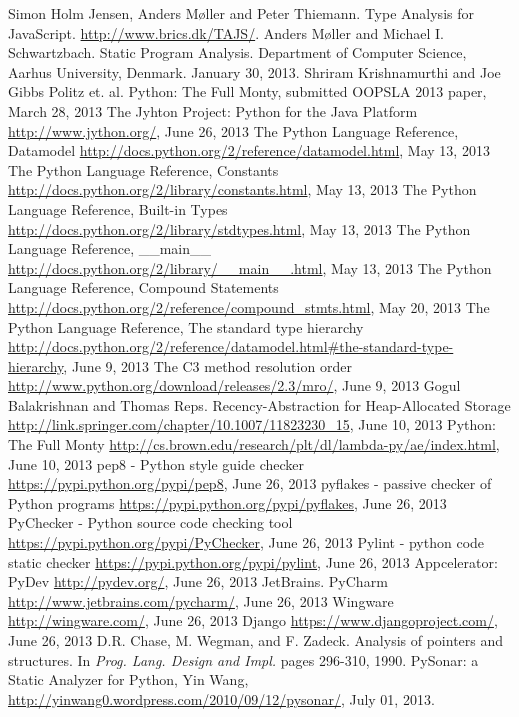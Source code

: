 \begin{thebibliography}{8}

 Simon Holm Jensen, Anders M\o ller and Peter Thiemann. Type Analysis for JavaScript. \url{http://www.brics.dk/TAJS/}.
 Anders M\o ller and Michael I. Schwartzbach. Static Program Analysis. Department of Computer Science, Aarhus University, Denmark. January 30, 2013.
 Shriram Krishnamurthi and Joe Gibbs Politz et. al. Python: The Full Monty, submitted OOPSLA 2013 paper, March 28, 2013
 The Jyhton Project: Python for the Java Platform \url{http://www.jython.org/}, June 26, 2013
 The Python Language Reference, Datamodel \url{http://docs.python.org/2/reference/datamodel.html}, May 13, 2013
 The Python Language Reference, Constants \url{http://docs.python.org/2/library/constants.html}, May 13, 2013
 The Python Language Reference, Built-in Types \url{http://docs.python.org/2/library/stdtypes.html}, May 13, 2013
 The Python Language Reference, \_\_main\_\_ \url{http://docs.python.org/2/library/__main__.html}, May 13, 2013
 The Python Language Reference, Compound Statements \url{http://docs.python.org/2/reference/compound_stmts.html}, May 20, 2013
 The Python Language Reference, The standard type hierarchy \url{http://docs.python.org/2/reference/datamodel.html#the-standard-type-hierarchy}, June 9, 2013
 The C3 method resolution order \url{http://www.python.org/download/releases/2.3/mro/}, June 9, 2013
 Gogul Balakrishnan and Thomas Reps. Recency-Abstraction for Heap-Allocated Storage \url{http://link.springer.com/chapter/10.1007/11823230_15}, June 10, 2013
 Python: The Full Monty \url{http://cs.brown.edu/research/plt/dl/lambda-py/ae/index.html}, June 10, 2013
 pep8 - Python style guide checker \url{https://pypi.python.org/pypi/pep8}, June 26, 2013
 pyflakes - passive checker of Python programs \url{https://pypi.python.org/pypi/pyflakes}, June 26, 2013
 PyChecker - Python source code checking tool \url{https://pypi.python.org/pypi/PyChecker}, June 26, 2013
 Pylint - python code static checker \url{https://pypi.python.org/pypi/pylint}, June 26, 2013
 Appcelerator: PyDev \url{http://pydev.org/}, June 26, 2013
 JetBrains. PyCharm \url{http://www.jetbrains.com/pycharm/}, June 26, 2013
 Wingware \url{http://wingware.com/}, June 26, 2013
 Django \url{https://www.djangoproject.com/}, June 26, 2013
 D.R. Chase, M. Wegman, and F. Zadeck. Analysis of pointers and structures. In \textit{Prog. Lang. Design and Impl.} pages 296-310, 1990.
 PySonar: a Static Analyzer for Python, Yin Wang, \url{http://yinwang0.wordpress.com/2010/09/12/pysonar/}, July 01, 2013.
\end{thebibliography}